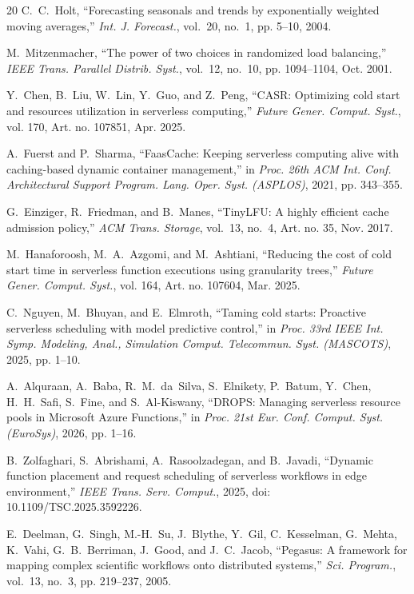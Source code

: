 \documentclass[conference]{IEEEtran}
\begin{document}
\begin{thebibliography}{20}
C.~C.~Holt, ``Forecasting seasonals and trends by exponentially weighted moving averages,'' \emph{Int. J. Forecast.}, vol.~20, no.~1, pp. 5--10, 2004.

M.~Mitzenmacher, ``The power of two choices in randomized load balancing,'' \emph{IEEE Trans. Parallel Distrib. Syst.}, vol.~12, no.~10, pp. 1094--1104, Oct. 2001.

Y.~Chen, B.~Liu, W.~Lin, Y.~Guo, and Z.~Peng, ``CASR: Optimizing cold start and resources utilization in serverless computing,'' \emph{Future Gener. Comput. Syst.}, vol. 170, Art. no. 107851, Apr. 2025.

A.~Fuerst and P.~Sharma, ``FaasCache: Keeping serverless computing alive with caching-based dynamic container management,'' in \emph{Proc. 26th ACM Int. Conf. Architectural Support Program. Lang. Oper. Syst. (ASPLOS)}, 2021, pp. 343--355.

G.~Einziger, R.~Friedman, and B.~Manes, ``TinyLFU: A highly efficient cache admission policy,'' \emph{ACM Trans. Storage}, vol.~13, no.~4, Art. no. 35, Nov. 2017.

M.~Hanaforoosh, M.~A.~Azgomi, and M.~Ashtiani, ``Reducing the cost of cold start time in serverless function executions using granularity trees,'' \emph{Future Gener. Comput. Syst.}, vol. 164, Art. no. 107604, Mar. 2025.

C.~Nguyen, M.~Bhuyan, and E.~Elmroth, ``Taming cold starts: Proactive serverless scheduling with model predictive control,'' in \emph{Proc. 33rd IEEE Int. Symp. Modeling, Anal., Simulation Comput. Telecommun. Syst. (MASCOTS)}, 2025, pp. 1--10.

A.~Alquraan, A.~Baba, R.~M.~da~Silva, S.~Elnikety, P.~Batum, Y.~Chen, H.~H.~Safi, S.~Fine, and S.~Al-Kiswany, ``DROPS: Managing serverless resource pools in Microsoft Azure Functions,'' in \emph{Proc. 21st Eur. Conf. Comput. Syst. (EuroSys)}, 2026, pp. 1--16.

B.~Zolfaghari, S.~Abrishami, A.~Rasoolzadegan, and B.~Javadi, ``Dynamic function placement and request scheduling of serverless workflows in edge environment,'' \emph{IEEE Trans. Serv. Comput.}, 2025, doi: 10.1109/TSC.2025.3592226.

E.~Deelman, G.~Singh, M.-H.~Su, J.~Blythe, Y.~Gil, C.~Kesselman, G.~Mehta, K.~Vahi, G.~B.~Berriman, J.~Good, and J.~C.~Jacob, ``Pegasus: A framework for mapping complex scientific workflows onto distributed systems,'' \emph{Sci. Program.}, vol.~13, no.~3, pp. 219--237, 2005.


\end{thebibliography}
\end{document}
